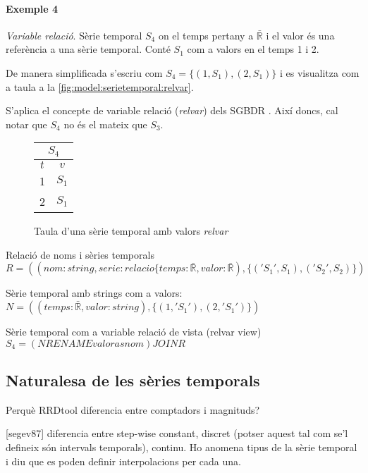 \paragraph{Exemple 4} \emph{Variable relació}.
Sèrie temporal $S_4$ on el temps pertany a $\bar{\mathbb{R}}$ i el valor és una referència a una sèrie temporal. Conté $S_1$ com a valors en el temps 1 i 2. 

De manera simplificada s'escriu com
$S_4 =  \{ (1,S_1) , (2,S_1) \}$ 
i es visualitza com a taula a la \autoref{fig:model:serietemporal:relvar}.

S'aplica el concepte de variable relació (\emph{relvar}) dels SGBDR \parencite[sec.\ 3.3]{date:introduction}.
Així doncs, cal notar que $S_4$  no és el mateix que $S_3$.
\begin{figure}[tp]
  \centering
  \begin{tabular}{|c|c|}
    \multicolumn{2}{c}{$S_4$} \\ \hline
    $t$  & $v$ \\ \hline
    1 & $S_1$ \\
    2 & $S_1$ \\ \hline
  \end{tabular}
  \caption{Taula d'una sèrie temporal amb valors \emph{relvar}}
  \label{fig:model:serietemporal:relvar}
\end{figure}


Relació de noms i sèries temporals $R =  ((nom:string,serie:relacio\{temps:\bar{\mathbb{R}},valor:\bar{\mathbb{R}}),\{ ('S_1',S_1),('S_2',S_2)  \})$

Sèrie temporal amb strings com a valors:
$N= ( (temps:\bar{\mathbb{R}},valor:string) ,\{ (1,'S_1') , (2,'S_1') \})$

Sèrie temporal com a variable relació de vista (relvar view)
$S_4 =  (N RENAME valor as nom) JOIN R$



\subsection{Naturalesa de les sèries temporals}


Perquè RRDtool diferencia entre comptadors i magnituds?

[segev87] diferencia entre step-wise constant, discret (potser aquest tal com se'l defineix són intervals temporals), continu. Ho anomena tipus de la sèrie temporal i diu que es poden definir interpolacions per cada una.


